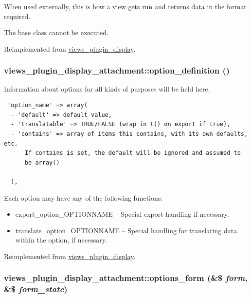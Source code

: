 When used externally, this is how a \hyperlink{classview}{view} gets run and returns data in the format required.

The base class cannot be executed. 

Reimplemented from \hyperlink{classviews__plugin__display_f99c4a303d3e409ab7b14c6cfcd3a1d8}{views\_\-plugin\_\-display}.\hypertarget{classviews__plugin__display__attachment_fd104a6bde92eab82cd1a8e1b654179f}{
\subsubsection[{option\_\-definition}]{\setlength{\rightskip}{0pt plus 5cm}views\_\-plugin\_\-display\_\-attachment::option\_\-definition ()}}
\label{classviews__plugin__display__attachment_fd104a6bde92eab82cd1a8e1b654179f}


Information about options for all kinds of purposes will be held here. 

\begin{Code}\begin{verbatim} 'option_name' => array(
  - 'default' => default value,
  - 'translatable' => TRUE/FALSE (wrap in t() on export if true),
  - 'contains' => array of items this contains, with its own defaults, etc.
      If contains is set, the default will be ignored and assumed to
      be array()

  ),
\end{verbatim}
\end{Code}

 Each option may have any of the following functions:\begin{itemize}
\item export\_\-option\_\-OPTIONNAME -- Special export handling if necessary.\item translate\_\-option\_\-OPTIONNAME -- Special handling for translating data within the option, if necessary. \end{itemize}


Reimplemented from \hyperlink{classviews__plugin__display_6eb433a3ccd4225c11b54955d86e2e01}{views\_\-plugin\_\-display}.\hypertarget{classviews__plugin__display__attachment_82864b279fb83e8d9ebddc40bc2851fa}{
\subsubsection[{options\_\-form}]{\setlength{\rightskip}{0pt plus 5cm}views\_\-plugin\_\-display\_\-attachment::options\_\-form (\&\$ {\em form}, \/  \&\$ {\em form\_\-state})}}
\label{classviews__plugin__display__attachment_82864b279fb83e8d9ebddc40bc2851fa}



